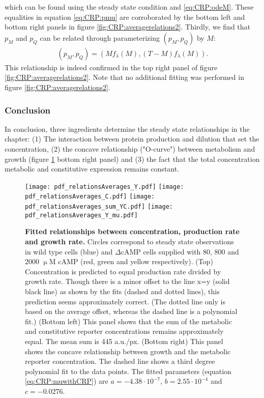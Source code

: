 which can be found using the steady state condition and \ref{eq:CRP:odeM}. These equalities in equation \ref{eq:CRP:pmu} are corroborated by the bottom left and bottom right panels in figure \ref{fig:CRP:averagerelations2}.
%
Thirdly, we find that $p_M$ and $p_Q$ can be related through parameterizing $(p_M, p_Q)$ by $M$:
%
\begin{align}
	\label{eq:CRP:pMpQ}	
	\left(p_M, p_Q\right) = 
	\left(M f_\lambda(M), (T-M) f_\lambda(M)\right)
	.
\end{align}
This relationship is indeed confirmed in the top right panel of figure \ref{fig:CRP:averagerelations2}.
%
Note that no additional fitting was performed in figure \ref{fig:CRP:averagerelations2}.

\subsubsection*{Conclusion}

In conclusion, three ingredients determine the steady state relationships in the chapter: 
(1) The interaction between protein production and dilution that set the concentration, 
(2) the concave relationship ("O-curve") between metabolism and growth (figure \ref{fig:CRP:averagerelations1} bottom right panel) and
(3) the fact that the total concentration metabolic and constitutive expression remains constant.

\begin{figure}%
	\centering
	\texttt{[image: pdf\_relationsAverages\_Y.pdf]}
	\texttt{[image: pdf\_relationsAverages\_C.pdf]}
	\texttt{[image: pdf\_relationsAverages\_sum\_YC.pdf]}
	\texttt{[image: pdf\_relationsAverages\_Y\_mu.pdf]}		
	\caption{ 
		\textbf{Fitted relationships between concentration, production rate and growth rate.}
		Circles correspond to steady state observations in wild type cells (blue) and $\Delta$cAMP cells supplied with 80, 800 and 2000 $\upmu$M cAMP (red, green and yellow respectively).
		(Top) Concentration is predicted to equal production rate divided by growth rate. Though there is a minor offset to the line x=y (solid black line) as shown by the fits (dashed and dotted lines), this prediction seems approximately correct. (The dotted line only is based on the average offset, whereas the dashed line is a polynomial fit.)
		(Bottom left) This panel shows that the sum of the metabolic and constitutive reporter concentrations remains approximately equal. The mean sum is 445 a.u./px.
		(Bottom right) This panel shows the concave relationship between growth and the metabolic reporter concentration. The dashed line shows a third degree polynomial fit to the data points. The fitted parameters (equation \ref{eq:CRP:muwithCRP}) are $a=-4.38\cdot10^{-7}$, $b=2.55\cdot10^{-4}$ and $c=-0.0276$.
	}
	\label{fig:CRP:averagerelations1}
\end{figure}%


